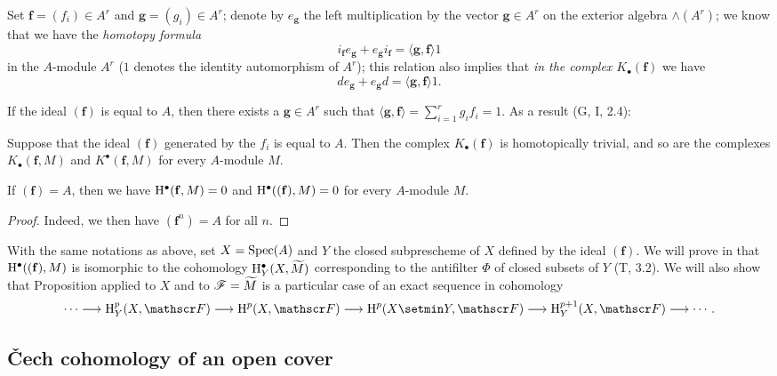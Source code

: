 \begin{env}[1.1.7]
\label{3.1.1.7}
Set $\mathbf{f}=(f_i)\in A^r$ and $\mathbf{g}=(g_i)\in A^r$; denote by $e_\mathbf{g}$ the left multiplication by the vector $\mathbf{g}\in A^r$ on the exterior algebra $\wedge(A^r)$; we know that we have the \emph{homotopy formula}
\[
  i_\mathbf{f}e_\mathbf{g}+e_\mathbf{g}i_\mathbf{f}=\langle\mathbf{g},\mathbf{f}\rangle 1
  \tag{1.1.7.1}
\]
in the $A$-module $A^r$ ($1$ denotes the identity automorphism of $A^r$); this relation also implies that \emph{in the complex $K_\bullet(\mathbf{f})$} we have
\[
  de_\mathbf{g}+e_\mathbf{g}d=\langle\mathbf{g},\mathbf{f}\rangle 1.
  \tag{1.1.7.2}
\]

If the ideal $(\mathbf{f})$ is equal to $A$, then there exists a $\mathbf{g}\in A^r$ such that $\langle\mathbf{g},\mathbf{f}\rangle=\sum_{i=1}^r g_i f_i=1$.
As a result (G, I, 2.4):
\end{env}

\begin{prop}[1.1.8]
\label{3.1.1.8}
Suppose that the ideal $(\mathbf{f})$ generated by the $f_i$ is equal to $A$.
Then the complex $K_\bullet(\mathbf{f})$ is homotopically trivial, and so are the complexes $K_\bullet(\mathbf{f},M)$ and $K^\bullet(\mathbf{f},M)$ for every $A$-module $M$.
\end{prop}

\begin{cor}[1.1.9]
\label{3.1.1.9}
If $(\mathbf{f})=A$, then we have $\mathrm{H}^\bullet(\mathbf{f},M)=0$ and $\mathrm{H}^\bullet((\mathbf{f}),M)=0$ for every $A$-module $M$.
\end{cor}

\begin{proof}
\label{proof-3.1.1.9}
Indeed, we then have $(\mathbf{f}^n)=A$ for all $n$.
\end{proof}

\begin{rmk}[1.1.10]
\label{3.1.1.10}
With the same notations as above, set $X={\mathop{\mathrm{Spec}}\nolimits}(A)$ and $Y$ the closed subprescheme of $X$ defined by the ideal $(\mathbf{f})$.
We will prove in  that $\mathrm{H}^\bullet((\mathbf{f}),M)$ is isomorphic to the cohomology $\mathrm{H}_Y^\bullet(X,{\widetilde{M}})$ corresponding to the antifilter $\Phi$ of closed subsets of $Y$ (T, 3.2).
We will also show that Proposition  applied to $X$ and to $\mathscr{F}={\widetilde{M}}$ is a particular case of an exact sequence in cohomology
\[
  \cdots\to\HH_Y^p(X,\sh{F})\to\HH^p(X,\sh{F})\to\HH^p(X\setmin Y,\sh{F})\to\HH_Y^{p+1}(X,\sh{F})\to\cdots.
\]
\end{rmk}

\subsection{\v Cech cohomology of an open cover}
\label{subsection-cech-cohomology-open-cover}

